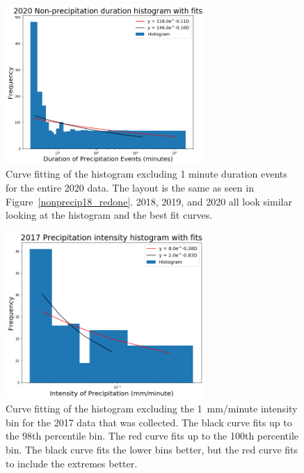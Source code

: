 \documentclass[11pt]{report}
\begin{document}
\begin{figure}[b]
  \centering
  \includegraphics[width=0.675\textwidth]{Figures/nonprecip_2020_new.png}
  \caption[2020 Non-precipitation duration Exponentials with contrasting curve fitting]
  {\label{nonprecip20_redone}Curve fitting of the histogram excluding
    1 minute duration events for the entire 2020 data. The layout is the
    same as seen in Figure~\ref{nonprecip18_redone}. 2018, 2019, and 2020 all look
    similar looking at the histogram and the best fit curves.}
\end{figure}

\clearpage
\begin{figure}[t]
  \centering
  \includegraphics[width=0.675\textwidth]{Figures/inten2017_fit.png}
  \caption[Fitting Intensity histogram for 2017 with different bins]
          {\label{i2017_fit} Curve fitting of the histogram excluding the
            1~mm/minute intensity bin for the 2017 data that was
            collected. The black curve fits up to the 98th percentile
            bin. The red curve fits up to the 100th percentile bin. The
            black curve fits the lower bins better, but the red curve fits
            to include the extremes better.  }
\end{figure}
\end{document}
